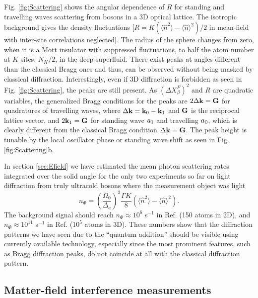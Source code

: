 Fig. \ref{fig:Scattering} shows the angular dependence of $R$ for
standing and travelling waves scattering from bosons in a 3D optical
lattice. The isotropic background gives the density fluctuations
[$R = K( \langle \hat{n}^2 \rangle - \langle \hat{n} \rangle^2 )/2$ in
mean-field with inter-site correlations neglected]. The radius of the
sphere changes from zero, when it is a Mott insulator with suppressed
fluctuations, to half the atom number at $K$ sites, $N_K/2$, in the
deep superfluid. There exist peaks at angles different than the
classical Bragg ones and thus, can be observed without being masked by
classical diffraction. Interestingly, even if 3D diffraction
\cite{miyake2011} is forbidden as seen in Fig. \ref{fig:Scattering},
the peaks are still present. As $(\Delta X^F_\beta)^2$ and $R$ are
quadratic variables, the generalized Bragg conditions for the peaks
are $2 \Delta \mathbf{k} = \mathbf{G}$ for quadratures of travelling waves,
where $\Delta \mathbf{k} = \mathbf{k}_0 - \mathbf{k}_1$ and $\mathbf{G}$ is the reciprocal
lattice vector, and $2 \mathbf{k}_1 = \mathbf{G}$ for standing wave $a_1$ and
travelling $a_0$, which is clearly different from the classical Bragg
condition $\Delta \mathbf{k} = \mathbf{G}$. The peak height is tunable by the
local oscillator phase or standing wave shift as seen in Fig.
\ref{fig:Scattering}b.

In section \ref{sec:Efield} we have estimated the mean photon
scattering rates integrated over the solid angle for the only two
experiments so far on light diffraction from truly ultracold bosons
where the measurement object was light
\begin{equation} 
  n_{\Phi}= \left(\frac{\Omega_0}{\Delta_a}\right)^2 \frac{\Gamma K}{8}
  (\langle\hat{n}^2\rangle-\langle\hat{n}\rangle^2).
\end{equation} 
The background signal should reach $n_\Phi \approx 10^6$ s$^{-1}$ in
Ref. \cite{weitenberg2011} (150 atoms in 2D), and
$n_\Phi \approx 10^{11}$ s$^{-1}$ in Ref. \cite{miyake2011} ($10^5$
atoms in 3D). These numbers show that the diffraction patterns we have
seen due to the ``quantum addition'' should be visible using currently
available technology, especially since the most prominent features,
such as Bragg diffraction peaks, do not coincide at all with the
classical diffraction pattern.

\subsection{Matter-field interference measurements}


